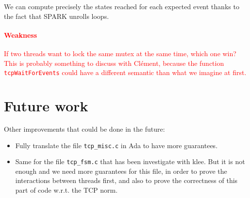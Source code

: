 \documentclass[a4paper, 10pt]{article}
\begin{document}
    We can compute precisely the states reached for each expected event thanks to the fact that SPARK
    unrolls loops.

    \textcolor{red}{\paragraph{Weakness} If two threads want to lock the same mutex at the same time, which one win?
    This is probably something to discuss with Clément, because the function \texttt{tcpWaitForEvents} could have a
    different semantic than what we imagine at first.}


    \section{Future work}

    Other improvements that could be done in the future:
    \begin{itemize}
        \item Fully translate the file \texttt{tcp\_misc.c} in Ada to have more guarantees.
        \item Same for the file \texttt{tcp\_fsm.c} that has been investigate with klee. But
        it is not enough and we need more guarantees for this file, in order to prove the
        interactions between threads first, and also to prove the correctness of this part
        of code w.r.t. the TCP norm.
    \end{itemize}

    \printbibliography
    
\end{document}
